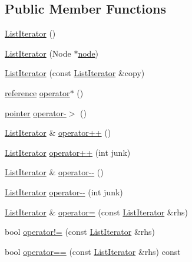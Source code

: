 \subsection*{Public Member Functions}
\begin{DoxyCompactItemize}
\item 
\hyperlink{structprism_1_1_list_iterator_aeba4da3849b9a3515abf938157e49f71}{List\+Iterator} ()
\item 
\hyperlink{structprism_1_1_list_iterator_a9c2bd9cb3764ff98930b7714bb1a614e}{List\+Iterator} (Node $\ast$\hyperlink{structprism_1_1_list_iterator_a7cbe2359c823f13675bcc1c6bba48142}{node})
\item 
\hyperlink{structprism_1_1_list_iterator_af6c71b9766b976fe369cfdc5e11870e3}{List\+Iterator} (const \hyperlink{structprism_1_1_list_iterator}{List\+Iterator} \&copy)
\item 
\hyperlink{structprism_1_1_list_iterator_a8102dfe3c26bb09d44c54ce276debf69}{reference} \hyperlink{structprism_1_1_list_iterator_a66d9bf77483a931f5a67271a17cd0059}{operator$\ast$} ()
\item 
\hyperlink{structprism_1_1_list_iterator_a7df7f6f08916f0bbe2e0b0ce675e0cee}{pointer} \hyperlink{structprism_1_1_list_iterator_a93729cce8b4e144c3e99265f967ebc5a}{operator-\/$>$} ()
\item 
\hyperlink{structprism_1_1_list_iterator}{List\+Iterator} \& \hyperlink{structprism_1_1_list_iterator_a09ec78585eeb7f4a8b40fe7f39319bc3}{operator++} ()
\item 
\hyperlink{structprism_1_1_list_iterator}{List\+Iterator} \hyperlink{structprism_1_1_list_iterator_a386861d4219158426572921e585115d7}{operator++} (int junk)
\item 
\hyperlink{structprism_1_1_list_iterator}{List\+Iterator} \& \hyperlink{structprism_1_1_list_iterator_a8878a4fdf7c991ceebb13f8e09d51671}{operator-\/-\/} ()
\item 
\hyperlink{structprism_1_1_list_iterator}{List\+Iterator} \hyperlink{structprism_1_1_list_iterator_a29fd6a61d71c69d5ebfb86ae691fd4a3}{operator-\/-\/} (int junk)
\item 
\hyperlink{structprism_1_1_list_iterator}{List\+Iterator} \& \hyperlink{structprism_1_1_list_iterator_a6b73aadac3d160fbdf523cef078d1221}{operator=} (const \hyperlink{structprism_1_1_list_iterator}{List\+Iterator} \&rhs)
\item 
bool \hyperlink{structprism_1_1_list_iterator_a6c1830b9c6d2abc9d70d334a3b86081c}{operator!=} (const \hyperlink{structprism_1_1_list_iterator}{List\+Iterator} \&rhs)
\item 
bool \hyperlink{structprism_1_1_list_iterator_a1e0617b8f0e18f8a56515092e9f4a9b1}{operator==} (const \hyperlink{structprism_1_1_list_iterator}{List\+Iterator} \&rhs) const 
\end{DoxyCompactItemize}
